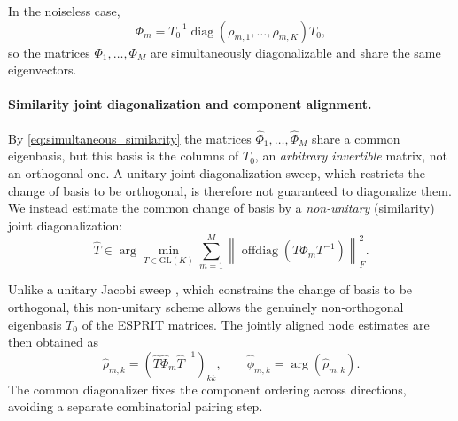 \documentclass[sigconf,natbib=true,anonymous=true,review=true]{acmart}
\newcommand{\C}{\mathbb{C}}
\begin{document}
In the noiseless case,
\begin{equation}
    \Phi_m
    =
    T_0^{-1}
    \operatorname{diag}(\rho_{m,1},\ldots,\rho_{m,K})
    T_0,
    \label{eq:simultaneous_similarity}
\end{equation}
so the matrices $\Phi_1,\ldots,\Phi_M$ are simultaneously diagonalizable and share
the same eigenvectors.

\paragraph{Similarity joint diagonalization and component alignment.}
By \eqref{eq:simultaneous_similarity} the matrices $\widehat\Phi_1,\ldots,\widehat\Phi_M$
share a common eigenbasis, but this basis is the columns of $T_0$, an
\emph{arbitrary invertible} matrix, not an orthogonal one. A unitary
joint-diagonalization sweep, which restricts the change of basis to be orthogonal,
is therefore not guaranteed to diagonalize them. We instead estimate the common
change of basis by a \emph{non-unitary} (similarity) joint diagonalization:
\begin{equation}
    \widehat T
    \in
    \arg\min_{T\in\mathrm{GL}(K)}
    \sum_{m=1}^M
    \left\|
        \operatorname{offdiag}
        \left(
            T\widehat\Phi_m T^{-1}
        \right)
    \right\|_F^2.
    \label{eq:jointdiag}
\end{equation}

Unlike a unitary Jacobi sweep \cite{cardoso1996jacobi}, which constrains the change of
basis to be orthogonal, this non-unitary scheme allows the genuinely non-orthogonal
eigenbasis $T_0$ of the ESPRIT matrices. The jointly aligned node estimates are then
obtained as
\begin{equation}
    \widehat \rho_{m,k}
    =
    \left(
        \widehat T\widehat\Phi_m\widehat T^{-1}
    \right)_{kk},
    \qquad
    \widehat \phi_{m,k}
    =
    \arg(\widehat \rho_{m,k}).
    \label{eq:aligned_nodes}
\end{equation}
The common diagonalizer fixes the component ordering across directions, avoiding a
separate combinatorial pairing step.
\end{document}
